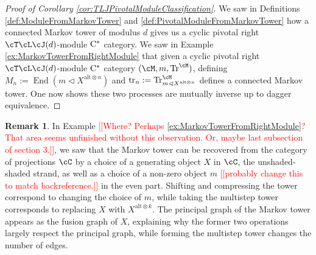 \documentclass[11pt]{article}
\theoremstyle{plain}
\theoremstyle{definition}
\newtheorem{rem}[thm]{Remark}
\DeclareMathOperator{\End}{End}
\DeclareMathOperator{\Tr}{Tr}
\DeclareMathOperator{\tr}{tr}
\newcommand{\Cstar}{\rm{C^*}}
\newcommand{\nn}[1]{\textcolor{red}{[[#1]]}}
\begin{document}
\begin{proof}[Proof of Corollary \ref{cor:TLJPivotalModuleClassification}]
We saw in Definitions \ref{def:ModuleFromMarkovTower} and \ref{def:PivotalModuleFromMarkovTower} how a connected Markov tower of modulus $d$ gives us a cyclic pivotal right $\cT\cL\cJ(d)$-module $\Cstar$ category.
We saw in Example \ref{ex:MarkovTowerFromRightModule} that given a cyclic pivotal right $\cT\cL\cJ(d)$-module $\Cstar$ category $(\cM, m,\Tr^\cM)$, 
defining $M_n := \End(m \vartriangleleft X^{\text{alt}\otimes n})$ and $\tr_n := \Tr^\cM_{m \vartriangleleft X^{\text{alt}\otimes n}}$ defines a connected Markov tower.
One now shows these two processes are mutually inverse up to dagger equivalence.
\end{proof}

\begin{rem}
In Example \nn{Where? Perhaps \ref{ex:MarkovTowerFromRightModule}? That area seems unfinished without this observation. Or, maybe last subsection of section 3.}, we saw that the Markov tower can be recovered from the category of projections $\cC$ by a choice of a generating object $X$ in $\cC$, the unshaded-shaded strand, as well as a choice of a non-zero object $m$ \nn{probably change this to match backreference.} in the even part. Shifting and compressing the tower correspond to changing the choice of $m$, while taking the multistep tower corresponds to replacing $X$ with $X^{\text{alt}\otimes{k}}$. The principal graph of the Markov tower appears as the fusion graph of $X$, explaining why the former two operations largely respect the principal graph, while forming the multistep tower changes the number of edges.
\end{rem}
\end{document}
